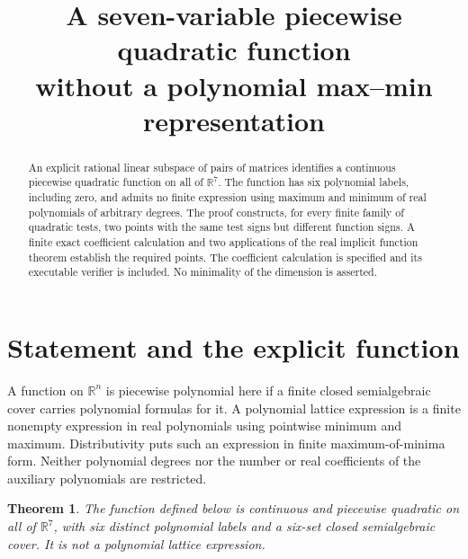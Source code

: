 \documentclass[11pt]{article}
\title{A seven-variable piecewise quadratic function\protect\\
without a polynomial max--min representation}
\author{}
\date{}
\newtheorem{theorem}{Theorem}
\newcommand{\R}{\mathbb R}
\begin{document}
\maketitle
\vspace{-2em}
\begin{abstract}
An explicit rational linear subspace of pairs of matrices identifies a
continuous piecewise quadratic function on all of $\R^7$. The function has
six polynomial labels, including zero, and admits no finite expression
using maximum and minimum of real polynomials of arbitrary degrees.
The proof constructs, for every finite family of quadratic tests, two
points with the same test signs but different function signs. A finite
exact coefficient calculation and two applications of the real implicit
function theorem establish the required points. The coefficient calculation
is specified and its executable verifier is included. No minimality of
the dimension is asserted.
\end{abstract}

\section{Statement and the explicit function}
A function on $\R^n$ is piecewise polynomial here if a finite closed
semialgebraic cover carries polynomial formulas for it. A polynomial
lattice expression is a finite nonempty expression in real polynomials
using pointwise minimum and maximum. Distributivity puts such an expression
in finite maximum-of-minima form. Neither polynomial degrees nor the number
or real coefficients of the auxiliary polynomials are restricted.

\begin{theorem}\label{thm:main}
The function defined below is continuous and piecewise quadratic on all
of $\R^7$, with six distinct polynomial labels and a six-set closed
semialgebraic cover. It is not a polynomial lattice expression.
\end{theorem}
\end{document}
